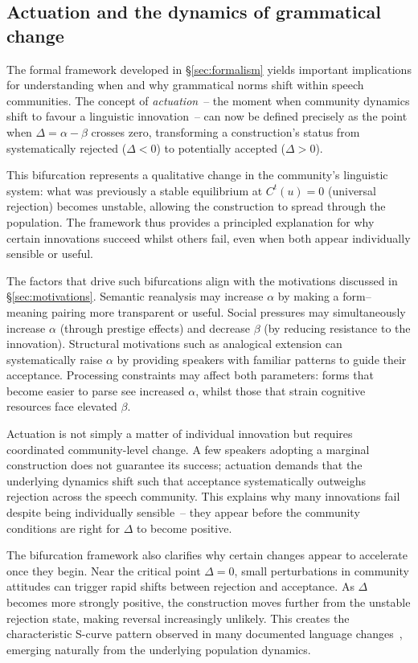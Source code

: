 \documentclass[12pt,letterpaper]{article}
\begin{document}
\subsection{Actuation and the dynamics of grammatical change}

The formal framework developed in \S\ref{sec:formalism} yields important implications for understanding when and why grammatical norms shift within speech communities. The concept of \textit{actuation}~-- the moment when community dynamics shift to favour a linguistic innovation~-- can now be defined precisely as the point when $\Delta = \alpha - \beta$ crosses zero, transforming a construction's status from systematically rejected ($\Delta < 0$) to potentially accepted ($\Delta > 0$).

This bifurcation represents a qualitative change in the community's linguistic system: what was previously a stable equilibrium at $C^t(u) = 0$ (universal rejection) becomes unstable, allowing the construction to spread through the population. The framework thus provides a principled explanation for why certain innovations succeed whilst others fail, even when both appear individually sensible or useful.

The factors that drive such bifurcations align with the motivations discussed in \S\ref{sec:motivations}. Semantic reanalysis may increase $\alpha$ by making a form--meaning pairing more transparent or useful. Social pressures may simultaneously increase $\alpha$ (through prestige effects) and decrease $\beta$ (by reducing resistance to the innovation). Structural motivations such as analogical extension can systematically raise $\alpha$ by providing speakers with familiar patterns to guide their acceptance. Processing constraints may affect both parameters: forms that become easier to parse see increased $\alpha$, whilst those that strain cognitive resources face elevated $\beta$.

Actuation is not simply a matter of individual innovation but requires coordinated community-level change. A few speakers adopting a marginal construction does not guarantee its success; actuation demands that the underlying dynamics shift such that acceptance systematically outweighs rejection across the speech community. This explains why many innovations fail despite being individually sensible~-- they appear before the community conditions are right for $\Delta$ to become positive.

The bifurcation framework also clarifies why certain changes appear to accelerate once they begin. Near the critical point $\Delta = 0$, small perturbations in community attitudes can trigger rapid shifts between rejection and acceptance. As $\Delta$ becomes more strongly positive, the construction moves further from the unstable rejection state, making reversal increasingly unlikely. This creates the characteristic S-curve pattern observed in many documented language changes~\autocite{kroch1989}, emerging naturally from the underlying population dynamics.
\end{document}
